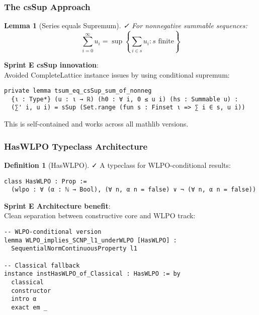 \documentclass[11pt]{article}
\newtheorem{lemma}[theorem]{Lemma}
\theoremstyle{definition}
\newtheorem{definition}[theorem]{Definition}
\theoremstyle{remark}
\newcommand{\leanok}{\textcolor{green!70!black}{✓}}
\newcommand{\sprintE}{\textcolor{orange!70!black}{\textbf{Sprint E}}}
\begin{document}
\subsubsection{The csSup Approach}

\begin{lemma}[Series equals Supremum]\label{lem:series-sup} \leanok{}
For nonnegative summable sequences:
\[
\sum_{i=0}^{\infty} u_i = \sup \left\{ \sum_{i \in s} u_i : s \text{ finite} \right\}
\]
\end{lemma}

\begin{mdframed}[style=okbox]
\textbf{\sprintE{} csSup innovation}:\\
Avoided CompleteLattice instance issues by using conditional supremum:
\begin{verbatim}
private lemma tsum_eq_csSup_sum_of_nonneg
  {ι : Type*} (u : ι → ℝ) (h0 : ∀ i, 0 ≤ u i) (hs : Summable u) :
  (∑' i, u i) = sSup (Set.range (fun s : Finset ι => ∑ i ∈ s, u i))
\end{verbatim}
This is self-contained and works across all mathlib versions.
\end{mdframed}

\subsubsection{HasWLPO Typeclass Architecture}

\begin{definition}[HasWLPO]\label{def:has-wlpo} \leanok{}
A typeclass for WLPO-conditional results:
\begin{verbatim}
class HasWLPO : Prop :=
  (wlpo : ∀ (α : ℕ → Bool), (∀ n, α n = false) ∨ ¬ (∀ n, α n = false))
\end{verbatim}
\end{definition}

\begin{mdframed}[style=okbox]
\textbf{\sprintE{} Architecture benefit}:\\
Clean separation between constructive core and WLPO track:
\begin{verbatim}
-- WLPO-conditional version
lemma WLPO_implies_SCNP_l1_underWLPO [HasWLPO] : 
  SequentialNormContinuousProperty l1

-- Classical fallback  
instance instHasWLPO_of_Classical : HasWLPO := by
  classical
  constructor
  intro α
  exact em _
\end{verbatim}
\end{mdframed}
\end{document}
